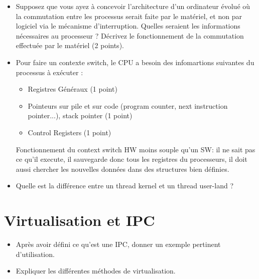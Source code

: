 \begin{itemize}
  \item Supposez que vous ayez \`a concevoir l'architecture d'un ordinateur \'evolu\'e où la commutation entre les processus serait faite par le mat\'eriel, et non par logiciel via le m\'ecanisme d'interruption. Quelles seraient les informations n\'ecessaires au processeur ? D\'ecrivez le fonctionnement de la commutation effectu\'ee par le mat\'eriel (2 points).
\end{itemize}

\begin{correction}

\begin{itemize}
  \item Pour faire un contexte switch, le CPU a besoin des infomartions suivantes du processus \`a ex\'ecuter :
  \begin{itemize}
    \item Registres G\'en\'eraux (1 point)
    \item Pointeurs sur pile et sur code (program counter, next instruction pointer...), stack pointer (1 point)
    \item Control Registers (1 point)
  \end{itemize}
  Fonctionnement du context switch HW moins souple qu'un SW: il ne sait pas ce qu'il execute, il sauvegarde donc tous les registres du processeurs, il doit aussi chercher les nouvelles donn\'ees dans des structures bien d\'efinies.
\end{itemize}

\end{correction}

\begin{itemize}
  \item Quelle est la diff\'erence entre un thread kernel et un thread user-land ?
\end{itemize}

\section{{Virtualisation et IPC}
         {\hfill{} }}

\begin{itemize}
  \item Apr\`es avoir d\'efini ce qu'est une IPC, donner un exemple pertinent d'utilisation.
  \item Expliquer les diff\'erentes m\'ethodes de virtualisation.
\end{itemize}

